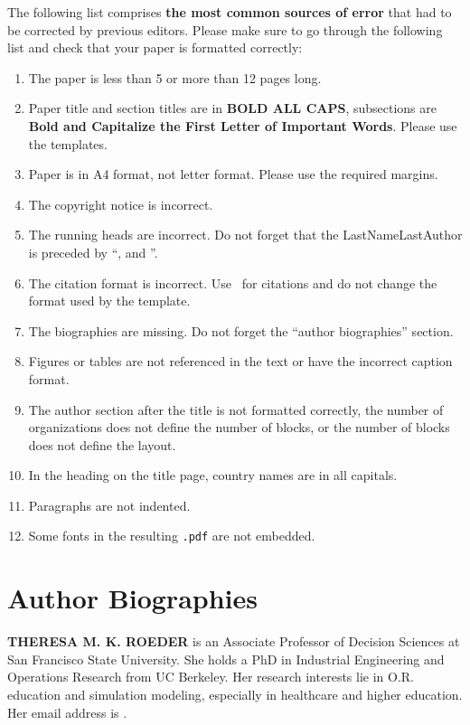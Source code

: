 \documentclass{scspaperproc}
\theoremstyle{scsthe}
\begin{document}
The following list comprises \textbf{the most common sources of error} that had to be corrected by previous editors. Please make sure to go through the following list and check that your paper is formatted correctly:
\begin{enumerate}
	\item	The paper is less than 5 or more than 12 pages long.
	\item	Paper title and section titles are in \textbf{BOLD ALL CAPS}, subsections are \textbf{Bold and Capitalize the First Letter of Important Words}. Please use the templates.
	\item	Paper is in A4 format, not letter format. Please use the required margins.
	\item	The copyright notice is incorrect.
	\item	The running heads are incorrect. Do not forget that the LastNameLastAuthor is preceded by ``, and ''.
	\item	The citation format is incorrect. Use \BibTeX\ for citations and do not change the format used by the template.
	\item	The biographies are missing. Do not forget the ``author biographies'' section.
	\item	Figures or tables are not referenced in the text or have the incorrect caption format.
	\item	The author section after the title is not formatted correctly, the number of organizations does not define the number of blocks, or the number of blocks does not define the layout.
	\item In the heading on the title page, country names are in all capitals.
	\item	Paragraphs are not indented.
	\item Some fonts in the resulting \texttt{.pdf} are not embedded.
\end{enumerate}





\section*{Author Biographies}

\textbf{\uppercase{THERESA M. K. ROEDER}} is an Associate Professor of Decision Sciences at San Francisco State University. She holds a PhD in Industrial Engineering and Operations Research from UC Berkeley. Her research interests lie in O.R. education and simulation modeling, especially in healthcare and higher education. Her email address is .
\end{document}
